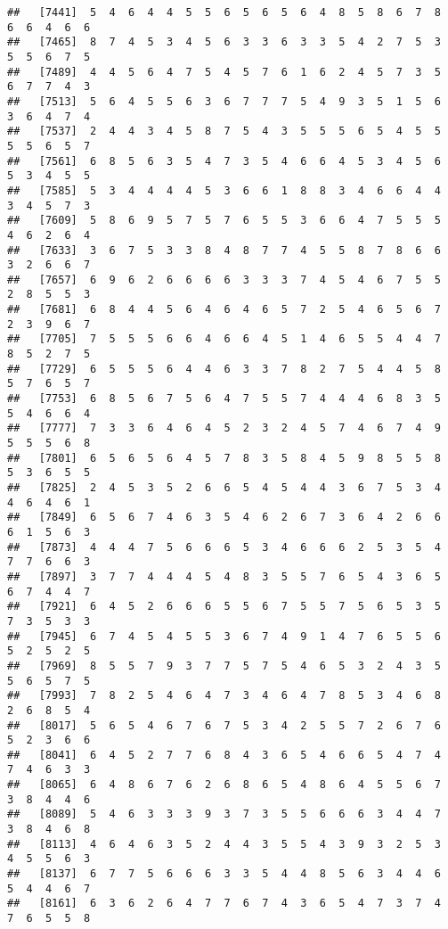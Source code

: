 \documentclass[
]{book}
\begin{document}
\begin{verbatim}
##   [7441]  5  4  6  4  4  5  5  6  5  6  5  6  4  8  5  8  6  7  8  6  6  4  6  6
##   [7465]  8  7  4  5  3  4  5  6  3  3  6  3  3  5  4  2  7  5  3  5  5  6  7  5
##   [7489]  4  4  5  6  4  7  5  4  5  7  6  1  6  2  4  5  7  3  5  6  7  7  4  3
##   [7513]  5  6  4  5  5  6  3  6  7  7  7  5  4  9  3  5  1  5  6  3  6  4  7  4
##   [7537]  2  4  4  3  4  5  8  7  5  4  3  5  5  5  6  5  4  5  5  5  5  6  5  7
##   [7561]  6  8  5  6  3  5  4  7  3  5  4  6  6  4  5  3  4  5  6  5  3  4  5  5
##   [7585]  5  3  4  4  4  4  5  3  6  6  1  8  8  3  4  6  6  4  4  3  4  5  7  3
##   [7609]  5  8  6  9  5  7  5  7  6  5  5  3  6  6  4  7  5  5  5  4  6  2  6  4
##   [7633]  3  6  7  5  3  3  8  4  8  7  7  4  5  5  8  7  8  6  6  3  2  6  6  7
##   [7657]  6  9  6  2  6  6  6  6  3  3  3  7  4  5  4  6  7  5  5  2  8  5  5  3
##   [7681]  6  8  4  4  5  6  4  6  4  6  5  7  2  5  4  6  5  6  7  2  3  9  6  7
##   [7705]  7  5  5  5  6  6  4  6  6  4  5  1  4  6  5  5  4  4  7  8  5  2  7  5
##   [7729]  6  5  5  5  6  4  4  6  3  3  7  8  2  7  5  4  4  5  8  5  7  6  5  7
##   [7753]  6  8  5  6  7  5  6  4  7  5  5  7  4  4  4  6  8  3  5  5  4  6  6  4
##   [7777]  7  3  3  6  4  6  4  5  2  3  2  4  5  7  4  6  7  4  9  5  5  5  6  8
##   [7801]  6  5  6  5  6  4  5  7  8  3  5  8  4  5  9  8  5  5  8  5  3  6  5  5
##   [7825]  2  4  5  3  5  2  6  6  5  4  5  4  4  3  6  7  5  3  4  4  6  4  6  1
##   [7849]  6  5  6  7  4  6  3  5  4  6  2  6  7  3  6  4  2  6  6  6  1  5  6  3
##   [7873]  4  4  4  7  5  6  6  6  5  3  4  6  6  6  2  5  3  5  4  7  7  6  6  3
##   [7897]  3  7  7  4  4  4  5  4  8  3  5  5  7  6  5  4  3  6  5  6  7  4  4  7
##   [7921]  6  4  5  2  6  6  6  5  5  6  7  5  5  7  5  6  5  3  5  7  3  5  3  3
##   [7945]  6  7  4  5  4  5  5  3  6  7  4  9  1  4  7  6  5  5  6  5  2  5  2  5
##   [7969]  8  5  5  7  9  3  7  7  5  7  5  4  6  5  3  2  4  3  5  5  6  5  7  5
##   [7993]  7  8  2  5  4  6  4  7  3  4  6  4  7  8  5  3  4  6  8  2  6  8  5  4
##   [8017]  5  6  5  4  6  7  6  7  5  3  4  2  5  5  7  2  6  7  6  5  2  3  6  6
##   [8041]  6  4  5  2  7  7  6  8  4  3  6  5  4  6  6  5  4  7  4  7  4  6  3  3
##   [8065]  6  4  8  6  7  6  2  6  8  6  5  4  8  6  4  5  5  6  7  3  8  4  4  6
##   [8089]  5  4  6  3  3  3  9  3  7  3  5  5  6  6  6  3  4  4  7  3  8  4  6  8
##   [8113]  4  6  4  6  3  5  2  4  4  3  5  5  4  3  9  3  2  5  3  4  5  5  6  3
##   [8137]  6  7  7  5  6  6  6  3  3  5  4  4  8  5  6  3  4  4  6  5  4  4  6  7
##   [8161]  6  3  6  2  6  4  7  7  6  7  4  3  6  5  4  7  3  7  4  7  6  5  5  8

\end{verbatim}
\end{document}
